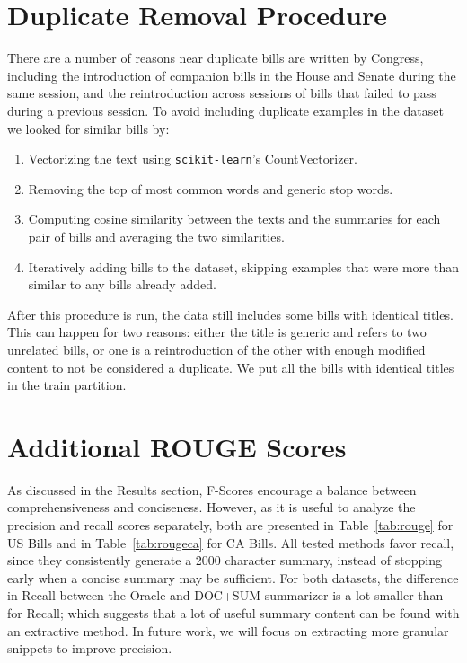 \documentclass[11pt,a4paper]{article}
\begin{document}





\appendix

\section{Duplicate Removal Procedure}
\label{sec:duplicates}
There are a number of reasons near duplicate bills are written by Congress, including the introduction of companion bills in the House and Senate during the same session, and the reintroduction across sessions of bills that failed to pass during a previous session.
To avoid including duplicate examples in the dataset we looked for similar bills by: 
\begin{enumerate}
    \item Vectorizing the text using \texttt{scikit-learn}'s CountVectorizer.
    \item Removing the top  of most common words and generic stop words.
    \item Computing cosine similarity between the texts and the summaries for each pair of bills and averaging the two similarities.
    \item Iteratively adding bills to the dataset, skipping examples that were more than  similar to any bills already added.
\end{enumerate} 


After this procedure is run, the data still includes some bills with identical titles. This can happen for two reasons: either the title is generic and refers to two unrelated bills, or one is a reintroduction of the other with enough modified content to not be considered a duplicate. We put all the bills with identical titles in the train partition.

\section{Additional ROUGE Scores}

As discussed in the Results section, F-Scores encourage a balance between comprehensiveness and conciseness. However, as it is useful to analyze the precision and recall scores separately, both are presented in Table~\ref{tab:rouge} for US Bills and in Table~\ref{tab:rougeca} for CA Bills. All tested methods favor recall, since they consistently generate a 2000 character summary, instead of stopping early when a concise summary may be sufficient. For both datasets, the difference in Recall between the Oracle and DOC+SUM summarizer is a lot smaller than for Recall; which suggests that a lot of useful summary content can be found with an extractive method. In future work, we will focus on extracting more granular snippets to improve precision.
\end{document}
